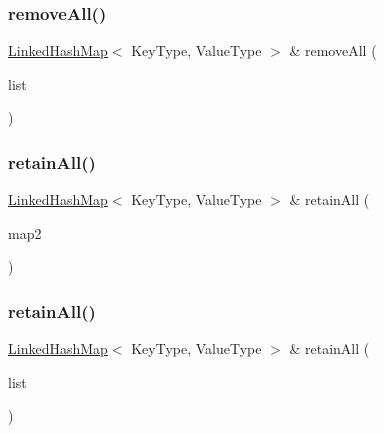 \mbox{\label{classLinkedHashMap_aa3c3540443fba343b0e8ecfea1ce14b1}} 
\subsubsection{\texorpdfstring{remove\+All()}{removeAll()}\hspace{0.1cm}{\footnotesize\ttfamily [2/2]}}
{\footnotesize\ttfamily \mbox{\hyperlink{classLinkedHashMap}{Linked\+Hash\+Map}}$<$ Key\+Type, Value\+Type $>$ \& remove\+All (\begin{DoxyParamCaption}\item[{std\+::initializer\+\_\+list$<$ std\+::pair$<$ Key\+Type, Value\+Type $>$ $>$}]{list }\end{DoxyParamCaption})}

\mbox{\label{classLinkedHashMap_a9bcc3af0a0717671f5bf22f2c886f7ff}} 
\subsubsection{\texorpdfstring{retain\+All()}{retainAll()}\hspace{0.1cm}{\footnotesize\ttfamily [1/2]}}
{\footnotesize\ttfamily \mbox{\hyperlink{classLinkedHashMap}{Linked\+Hash\+Map}}$<$ Key\+Type, Value\+Type $>$ \& retain\+All (\begin{DoxyParamCaption}\item[{const \mbox{\hyperlink{classLinkedHashMap}{Linked\+Hash\+Map}}$<$ Key\+Type, Value\+Type $>$ \&}]{map2 }\end{DoxyParamCaption})}

\mbox{\label{classLinkedHashMap_a536d98ab557dfbb13f9b7c712f45243f}} 
\subsubsection{\texorpdfstring{retain\+All()}{retainAll()}\hspace{0.1cm}{\footnotesize\ttfamily [2/2]}}
{\footnotesize\ttfamily \mbox{\hyperlink{classLinkedHashMap}{Linked\+Hash\+Map}}$<$ Key\+Type, Value\+Type $>$ \& retain\+All (\begin{DoxyParamCaption}\item[{std\+::initializer\+\_\+list$<$ std\+::pair$<$ Key\+Type, Value\+Type $>$ $>$}]{list }\end{DoxyParamCaption})}

